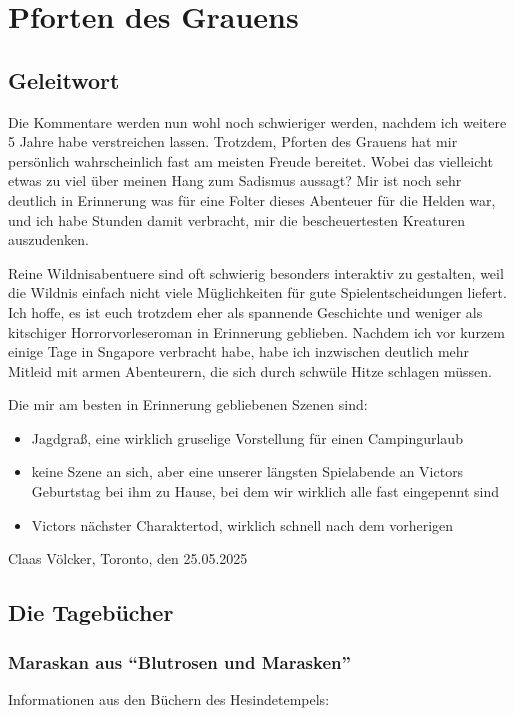 \chapter{Pforten des Grauens}

\section{Geleitwort}

Die Kommentare werden nun wohl noch schwieriger werden, nachdem ich weitere 5 Jahre habe verstreichen lassen. Trotzdem, Pforten des Grauens hat mir persönlich wahrscheinlich fast am meisten Freude bereitet. Wobei das vielleicht etwas zu viel über meinen Hang zum Sadismus aussagt? Mir ist noch sehr deutlich in Erinnerung was für eine Folter dieses Abenteuer für die Helden war, und ich habe Stunden damit verbracht, mir die bescheuertesten Kreaturen auszudenken.

Reine Wildnisabentuere sind oft schwierig besonders interaktiv zu gestalten, weil die Wildnis einfach nicht viele Müglichkeiten für gute Spielentscheidungen liefert. Ich hoffe, es ist euch trotzdem eher als spannende Geschichte und weniger als kitschiger Horrorvorleseroman in Erinnerung geblieben. Nachdem ich vor kurzem einige Tage in Sngapore verbracht habe, habe ich inzwischen deutlich mehr Mitleid mit armen Abenteurern, die sich durch schwüle Hitze schlagen müssen.

Die mir am besten in Erinnerung gebliebenen Szenen sind:
\begin{itemize}
\item Jagdgraß, eine wirklich gruselige Vorstellung für einen Campingurlaub
\item keine Szene an sich, aber eine unserer längsten Spielabende an Victors Geburtstag bei ihm zu Hause, bei dem wir wirklich alle fast eingepennt sind
\item Victors nächster Charaktertod, wirklich schnell nach dem vorherigen
\end{itemize}


\begin{flushright}
Claas Völcker, Toronto, den 25.05.2025
\end{flushright}


\section{Die Tagebücher}

\subsection{Maraskan aus ``Blutrosen und Marasken''}
Informationen aus den Büchern des Hesindetempels:

